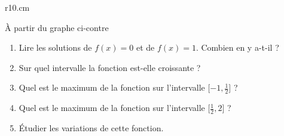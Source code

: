 
\begin{exercice}\label{exoSeconde-0047}

\begin{wrapfigure}{r}{10.cm}
   \vspace{-0.5cm}        %
   \centering
   
\end{wrapfigure}

    À partir du graphe ci-contre
    \begin{enumerate}
        \item
            Lire les solutions de \( f(x)=0\) et de  \( f(x)=1\). Combien en y a-t-il ?
        \item
            Sur quel intervalle la fonction est-elle croissante ?
        \item 
            Quel est le maximum de la fonction sur l'intervalle \( \mathopen[ -1 , \frac{ 1 }{2} \mathclose]\) ?
        \item 
            Quel est le maximum de la fonction sur l'intervalle \( \mathopen[ \frac{ 1 }{2} , 2 \mathclose]\) ?
        \item
            Étudier les variations de cette fonction. 
    \end{enumerate}

\end{exercice}
